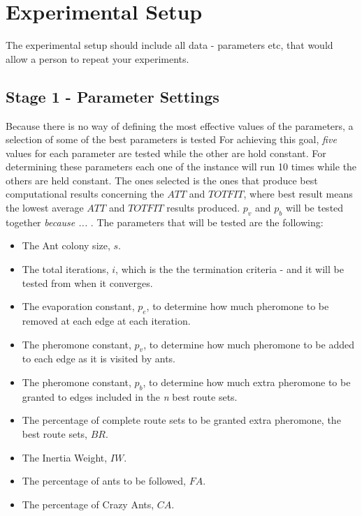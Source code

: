 \section{Experimental Setup}

The experimental setup should include all data - parameters etc, that would allow a person to repeat your experiments. 
 
\subsection{Stage 1 - Parameter Settings}
\label{subsec:parameterSettings_setup}

Because there is no way of defining the most effective values of the parameters, a selection of some of the best parameters is tested For achieving this goal, \textit{five} values for each parameter are tested while the other are hold constant. For determining these parameters each one of the instance will run 10 times while the others are held constant. The ones  selected is the ones that produce best computational results concerning the $ATT$ and $TOTFIT$, where best result means the lowest average $ATT$ and $TOTFIT$ results produced. $p_{v}$ and $p_{b}$ will be tested together \emph{\color{red}because ... }. The parameters that will be tested are the following:

\begin{itemize}
\item The Ant colony size, $s$.
\item The total iterations, $i$, which is the the termination criteria - and it will be tested from when it converges. 
\item The evaporation constant, $p_{e}$, to determine how much pheromone to be removed at each edge at each iteration. 
\item The pheromone constant, $p_{v}$, to determine how much pheromone to be added to each edge as it is visited by ants. 
\item The pheromone constant, $p_{b}$, to determine how much extra pheromone to be granted to edges included in the \textit{n} best route sets.
\item The percentage of complete route sets to be granted extra pheromone, the best route sets, $BR$.
\item The Inertia Weight, $IW$.
\item The percentage of ants to be followed, $FA$.
\item The percentage of Crazy Ants, $CA$.
\end{itemize}

